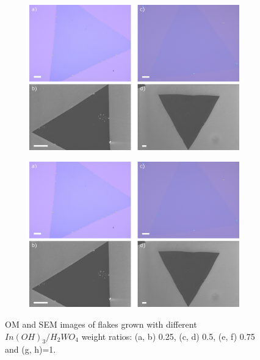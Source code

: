 \begin{figure}[!ht]
	\begin{center}
		\begin{subfigure}[b]{0.7\textwidth}
			\includegraphics[width=\textwidth]{In/OMSEMImages1.png}
			\label{fig:InOMSEMImages1}
		\end{subfigure}
		\qquad
		\begin{subfigure}[b]{0.7\textwidth}
			\includegraphics[width=\textwidth]{In/OMSEMImages1.png}
			\label{fig:InOMSEMImages2}
		\end{subfigure}
		\caption{OM and SEM images of flakes grown with different $In(OH)_3/H_2WO_4$ weight ratios: (a, b) 0.25, (c, d) 0.5, (e, f) 0.75 and (g, h)=1.}
		\label{fig:InOMSEMImages}
	\end{center}
\end{figure}

